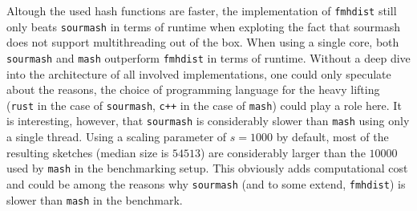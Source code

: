 Altough the used hash functions are faster, the implementation of
\texttt{fmhdist} still only beats \texttt{sourmash} in terms of runtime when
exploting the fact that sourmash does not support multithreading out of the box.
When using a single core, both \texttt{sourmash} and \texttt{mash} outperform
\texttt{fmhdist} in terms of runtime. Without a deep dive into the architecture
of all involved implementations, one could only speculate about the reasons, the
choice of programming language for the heavy lifting (\texttt{rust} in the case
of \texttt{sourmash}, \texttt{c++} in the case of \texttt{mash}) could play a
role here. It is interesting, however, that \texttt{sourmash} is considerably
slower than \texttt{mash} using only a single thread. Using a scaling parameter
of $s=1000$ by default, most of the resulting sketches (median size is $54513$)
are considerably larger than the $10000$ used by \texttt{mash} in the
benchmarking setup. This obviously adds computational cost and could be among
the reasons why \texttt{sourmash} (and to some extend, \texttt{fmhdist}) is
slower than \texttt{mash} in the benchmark.

\cleardoublepage

